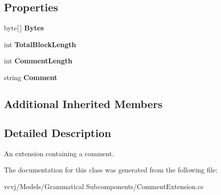 \subsection*{Properties}
\begin{DoxyCompactItemize}
\item 
byte\mbox{[}$\,$\mbox{]} {\bfseries Bytes}\hypertarget{classvcvj_1_1_models_1_1_grammatical___subcomponents_1_1_comment_extension_a43e9e21eb429c15a5813104bae40d3eb}{}\label{classvcvj_1_1_models_1_1_grammatical___subcomponents_1_1_comment_extension_a43e9e21eb429c15a5813104bae40d3eb}

\item 
int {\bfseries Total\+Block\+Length}\hypertarget{classvcvj_1_1_models_1_1_grammatical___subcomponents_1_1_comment_extension_a015854c766ce12c2cf5cbdabaa889e8e}{}\label{classvcvj_1_1_models_1_1_grammatical___subcomponents_1_1_comment_extension_a015854c766ce12c2cf5cbdabaa889e8e}

\item 
int {\bfseries Comment\+Length}\hypertarget{classvcvj_1_1_models_1_1_grammatical___subcomponents_1_1_comment_extension_acbfded4d53c0101311d2c44745a80b55}{}\label{classvcvj_1_1_models_1_1_grammatical___subcomponents_1_1_comment_extension_acbfded4d53c0101311d2c44745a80b55}

\item 
string {\bfseries Comment}\hypertarget{classvcvj_1_1_models_1_1_grammatical___subcomponents_1_1_comment_extension_a5635aba86f6c8375809715a61cc4f4d6}{}\label{classvcvj_1_1_models_1_1_grammatical___subcomponents_1_1_comment_extension_a5635aba86f6c8375809715a61cc4f4d6}

\end{DoxyCompactItemize}
\subsection*{Additional Inherited Members}


\subsection{Detailed Description}
An extension containing a comment. 



The documentation for this class was generated from the following file\+:\begin{DoxyCompactItemize}
\item 
vcvj/\+Models/\+Grammatical Subcomponents/Comment\+Extension.\+cs\end{DoxyCompactItemize}
